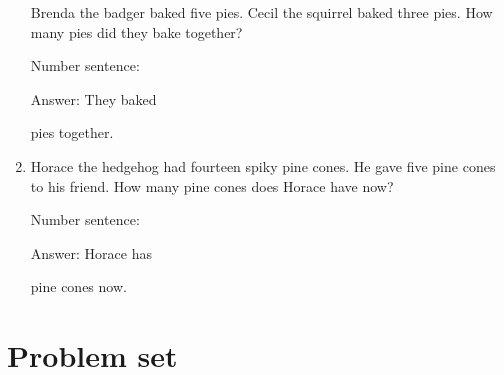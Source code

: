 \documentclass{tufte-book}
\begin{document}
\begin{enumerate}
  Brenda the badger baked five pies. Cecil the squirrel baked three
  pies. How many pies did they bake together?\medskip\par
  Number sentence:
  \dotfill\medskip\par
  Answer: They baked
  \dotfill\medskip\par\mbox{}\dotfill\medskip\par\mbox{}\dotfill\bigskip
  pies together.
\item
  Horace the hedgehog had fourteen spiky pine cones. He gave five pine
  cones to his friend. How many pine cones does Horace have now?\medskip\par
  Number sentence:
  \dotfill\medskip\par
  Answer: Horace has
  \dotfill\medskip\par\mbox{}\dotfill\medskip\par\mbox{}\dotfill\bigskip
  pine cones now.
\end{enumerate}



\clearpage\section{Problem set }
\end{document}
